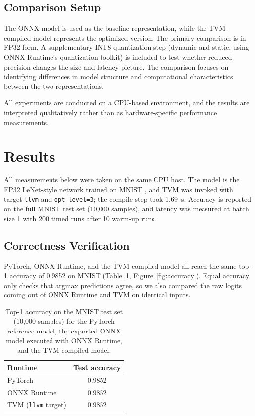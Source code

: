 \documentclass[fleqn,10pt]{olplainarticle}
\begin{document}
\subsection{Comparison Setup}

The ONNX model is used as the baseline representation, while the TVM-compiled model represents the optimized version. The primary comparison is in FP32 form. A supplementary INT8 quantization step (dynamic and static, using ONNX Runtime's quantization toolkit) is included to test whether reduced precision changes the size and latency picture. The comparison focuses on identifying differences in model structure and computational characteristics between the two representations.

All experiments are conducted on a CPU-based environment, and the results are interpreted qualitatively rather than as hardware-specific performance measurements.

\section{Results}

All measurements below were taken on the same CPU host. The model is the FP32 LeNet-style network trained on MNIST \cite{lecun1998mnist}, and TVM was invoked with target \texttt{llvm} and \texttt{opt\_level=3}; the compile step took 1.69~s. Accuracy is reported on the full MNIST test set (10{,}000 samples), and latency was measured at batch size 1 with 200 timed runs after 10 warm-up runs.

\subsection{Correctness Verification}

PyTorch, ONNX Runtime, and the TVM-compiled model all reach the same top-1 accuracy of 0.9852 on MNIST (Table~\ref{tab:accuracy}, Figure~\ref{fig:accuracy}). Equal accuracy only checks that argmax predictions agree, so we also compared the raw logits coming out of ONNX Runtime and TVM on identical inputs.

\begin{table}[H]
\centering
\caption{Top-1 accuracy on the MNIST test set (10{,}000 samples) for the PyTorch reference model, the exported ONNX model executed with ONNX Runtime, and the TVM-compiled model.}
\label{tab:accuracy}
\begin{tabular}{lc}
\hline
Runtime & Test accuracy \\
\hline
PyTorch & 0.9852 \\
ONNX Runtime & 0.9852 \\
TVM (\texttt{llvm} target) & 0.9852 \\
\hline
\end{tabular}
\end{table}
\end{document}
